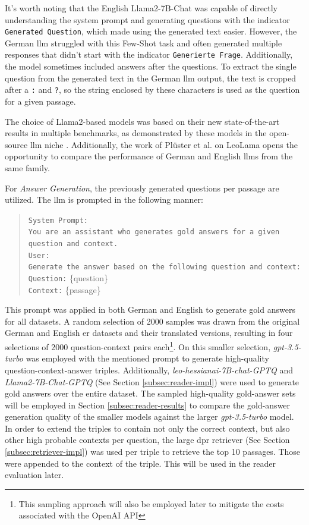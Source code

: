 It's worth noting that the English Llama2-7B-Chat was capable of directly understanding the system prompt and generating questions with the indicator \texttt{Generated Question}, which made using the generated text easier. However, the German \gls{llm} struggled with this Few-Shot task and often generated multiple responses that didn't start with the indicator \texttt{Generierte Frage}. Additionally, the model sometimes included answers after the questions. To extract the single question from the generated text in the German \gls{llm} output, the text is cropped after a \texttt{:} and \texttt{?}, so the string enclosed by these characters is used as the question for a given passage. 

The choice of Llama2-based models was based on their new state-of-the-art results in multiple benchmarks, as demonstrated by these models in the open-source \gls{llm} niche \cite{touvron_llama_2023}. Additionally, the work of Plüster et al. \cite{pluster_leolm_2023} on LeoLama opens the opportunity to compare the performance of German and English \gls{llm}s from the same family.

For \textit{Answer Generation}, the previously generated questions per passage are utilized. The \gls{llm} is prompted in the following manner:

\begin{quote}
    \texttt{System Prompt:}\\
    \texttt{You are an assistant who generates gold answers for a given question and context.}\\
    \texttt{User:}\\
    \texttt{Generate the answer based on the following question and context:}\\
    \texttt{Question:} \{question\} \\
    \texttt{Context:} \{passage\}
\end{quote}

This prompt was applied in both German and English to generate gold answers for all datasets. A random selection of 2000 samples was drawn from the original German and English \gls{er} datasets and their translated versions, resulting in four selections of 2000 question-context pairs each\footnote{This sampling approach will also be employed later to mitigate the costs associated with the OpenAI API}. On this smaller selection, \textit{gpt-3.5-turbo} was employed with the mentioned prompt to generate high-quality question-context-answer triples. Additionally, \textit{leo-hessianai-7B-chat-GPTQ} and \textit{Llama2-7B-Chat-GPTQ} (See Section \ref{subsec:reader-impl}) were used to generate gold answers over the entire dataset. The sampled high-quality gold-answer sets will be employed in Section \ref{subsec:reader-results} to compare the gold-answer generation quality of the smaller models against the larger \textit{gpt-3.5-turbo} model. In order to extend the triples to contain not only the correct context, but also other high probable contexts per question, the large \gls{dpr} retriever (See Section \ref{subsec:retriever-impl}) was used per triple to retrieve the top 10 passages. Those were appended to the context of the triple. This will be used in the reader evaluation later.


